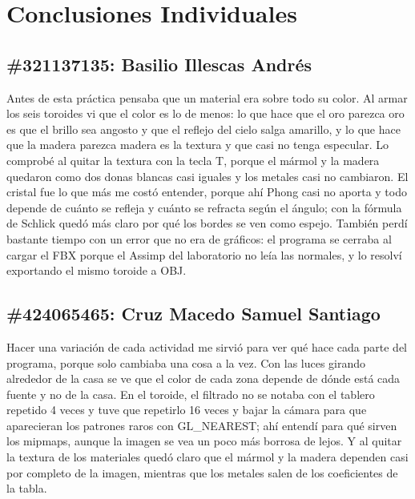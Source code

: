
\section{Conclusiones Individuales}

\subsection*{\#321137135: Basilio Illescas Andrés}
Antes de esta práctica pensaba que un material era sobre todo su color. Al armar los seis toroides vi que el color es lo de menos: lo que hace que el oro parezca oro es que el brillo sea angosto y que el reflejo del cielo salga amarillo, y lo que hace que la madera parezca madera es la textura y que casi no tenga especular. Lo comprobé al quitar la textura con la tecla T, porque el mármol y la madera quedaron como dos donas blancas casi iguales y los metales casi no cambiaron. El cristal fue lo que más me costó entender, porque ahí Phong casi no aporta y todo depende de cuánto se refleja y cuánto se refracta según el ángulo; con la fórmula de Schlick quedó más claro por qué los bordes se ven como espejo. También perdí bastante tiempo con un error que no era de gráficos: el programa se cerraba al cargar el FBX porque el Assimp del laboratorio no leía las normales, y lo resolví exportando el mismo toroide a OBJ.

\subsection*{\#424065465: Cruz Macedo Samuel Santiago}
Hacer una variación de cada actividad me sirvió para ver qué hace cada parte del programa, porque solo cambiaba una cosa a la vez. Con las luces girando alrededor de la casa se ve que el color de cada zona depende de dónde está cada fuente y no de la casa. En el toroide, el filtrado no se notaba con el tablero repetido 4 veces y tuve que repetirlo 16 veces y bajar la cámara para que aparecieran los patrones raros con GL\_NEAREST; ahí entendí para qué sirven los mipmaps, aunque la imagen se vea un poco más borrosa de lejos. Y al quitar la textura de los materiales quedó claro que el mármol y la madera dependen casi por completo de la imagen, mientras que los metales salen de los coeficientes de la tabla.

